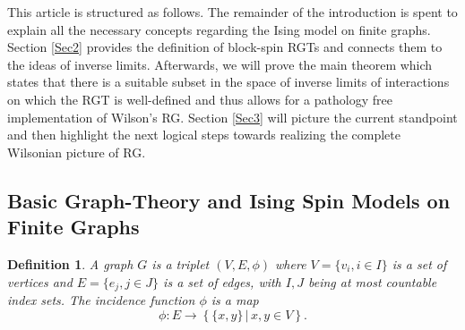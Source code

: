 \documentclass{article}
\newtheorem{definition}[theorem]{Definition}
\begin{document}
This article is structured as follows. The remainder of the introduction is spent to explain all the necessary concepts regarding the Ising model on finite graphs. Section \ref{Sec2} provides the definition of block-spin RGTs and connects them to the ideas of inverse limits. Afterwards, we will prove the main theorem which states that there is a suitable subset in the space of inverse limits of interactions on which the RGT is well-defined and thus allows for a pathology free implementation of Wilson's RG. Section \ref{Sec3} will picture the current standpoint and then highlight the next logical steps towards realizing the complete Wilsonian picture of RG.


\subsection{Basic Graph-Theory and Ising Spin Models on Finite Graphs}



\begin{definition}
    A graph $G$ is a triplet $(V,E,\phi)$ where $V=\{v_i, i\in I\}$ is a set of vertices and $E=\{e_j, j\in J\}$ is a set of edges, with $I,J$ being at most countable index sets. The incidence function $\phi$ is a map
    \begin{equation}
        \phi:E\to\left\{\{x,y\}\,|\,x,y\in V\right\}.
    \end{equation}
\end{definition}
\end{document}
